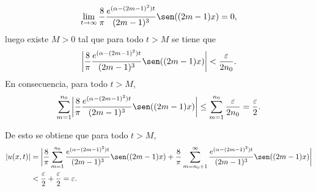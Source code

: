 \documentclass[a4paper, 12pt, extrafontsizes]{memoir}
\begin{document}
\begin{solution}
\begin{enumerate}
\begin{itemize}
        \[\lim_{t \to \infty}\frac{8}{\pi}\frac{e^{(\alpha-(2m-1)^2)t}}{(2m-1)^3}\sen((2m-1)x) = 0,\]
        luego existe $M > 0$ tal que para todo $t > M$ se tiene que
        \[\biggl|\frac{8}{\pi}\frac{e^{(\alpha-(2m-1)^2)t}}{(2m-1)^3}\sen((2m-1)x)\biggr| < \frac{\varepsilon}{2n_0}.\]
        En consecuencia, para todo $t > M$,
        \[\sum_{m=1}^{n_0}\biggl|\frac{8}{\pi}\frac{e^{(\alpha-(2m-1)^2)t}}{(2m-1)^3}\sen((2m-1)x)\biggr| \leq \sum_{m=1}^{n_0} \frac{\varepsilon}{2n_0} = \frac{\varepsilon}{2}.\]
    \end{itemize}
    De esto se obtiene que para todo $t > M$,
    \[\begin{aligned}
        |u(x,t)| &= \biggl|\frac{8}{\pi}\sum_{m=1}^{n_0} \frac{e^{(\alpha-(2m-1)^2)t}}{(2m-1)^3}\sen((2m-1)x) + \frac{8}{\pi}\sum_{m=n_0+1}^\infty \frac{e^{(\alpha-(2m-1)^2)t}}{(2m-1)^3}\sen((2m-1)x)\biggr| \\
        &< \frac{\varepsilon}{2}+\frac{\varepsilon}{2} = \varepsilon.\\
    \end{aligned}\]
\end{enumerate}
\end{solution}
\end{document}
